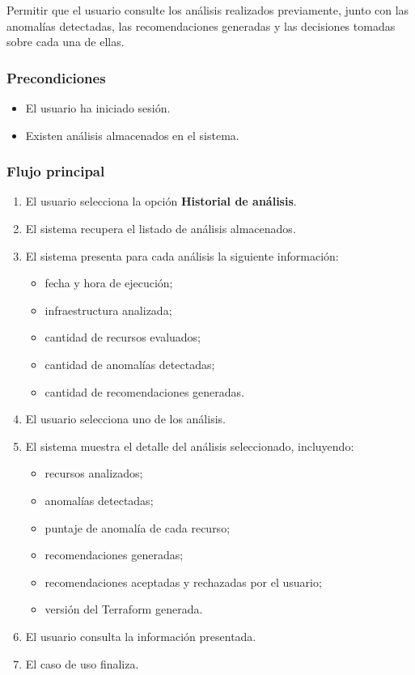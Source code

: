 Permitir que el usuario consulte los análisis realizados previamente, junto con las anomalías detectadas, las recomendaciones generadas y las decisiones tomadas sobre cada una de ellas.

\subsubsection*{Precondiciones}

\begin{itemize}
\item El usuario ha iniciado sesión.
\item Existen análisis almacenados en el sistema.
\end{itemize}

\subsubsection*{Flujo principal}

\begin{enumerate}
\item El usuario selecciona la opción \textbf{Historial de análisis}.
\item El sistema recupera el listado de análisis almacenados.
\item El sistema presenta para cada análisis la siguiente información:
  \begin{itemize}
  \item fecha y hora de ejecución;
  \item infraestructura analizada;
  \item cantidad de recursos evaluados;
  \item cantidad de anomalías detectadas;
  \item cantidad de recomendaciones generadas.
  \end{itemize}
\item El usuario selecciona uno de los análisis.
\item El sistema muestra el detalle del análisis seleccionado, incluyendo:
  \begin{itemize}
  \item recursos analizados;
  \item anomalías detectadas;
  \item puntaje de anomalía de cada recurso;
  \item recomendaciones generadas;
  \item recomendaciones aceptadas y rechazadas por el usuario;
  \item versión del Terraform generada.
  \end{itemize}
\item El usuario consulta la información presentada.
\item El caso de uso finaliza.
\end{enumerate}

